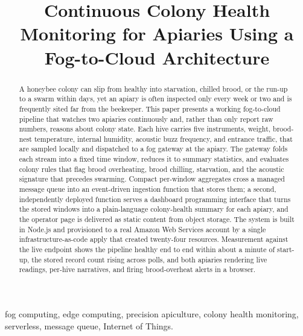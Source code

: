 \documentclass[conference]{IEEEtran}
\begin{document}
\title{Continuous Colony Health Monitoring for Apiaries Using a Fog-to-Cloud Architecture}

\author{
}

\maketitle

\begin{abstract}
A honeybee colony can slip from healthy into starvation, chilled brood, or the run-up to a swarm within days, yet an apiary is often inspected only every week or two and is frequently sited far from the beekeeper. This paper presents a working fog-to-cloud pipeline that watches two apiaries continuously and, rather than only report raw numbers, reasons about colony state. Each hive carries five instruments, weight, brood-nest temperature, internal humidity, acoustic buzz frequency, and entrance traffic, that are sampled locally and dispatched to a fog gateway at the apiary. The gateway folds each stream into a fixed time window, reduces it to summary statistics, and evaluates colony rules that flag brood overheating, brood chilling, starvation, and the acoustic signature that precedes swarming. Compact per-window aggregates cross a managed message queue into an event-driven ingestion function that stores them; a second, independently deployed function serves a dashboard programming interface that turns the stored windows into a plain-language colony-health summary for each apiary, and the operator page is delivered as static content from object storage. The system is built in Node.js and provisioned to a real Amazon Web Services account by a single infrastructure-as-code apply that created twenty-four resources. Measurement against the live endpoint shows the pipeline healthy end to end within about a minute of start-up, the stored record count rising across polls, and both apiaries rendering live readings, per-hive narratives, and firing brood-overheat alerts in a browser.
\end{abstract}

\begin{IEEEkeywords}
fog computing, edge computing, precision apiculture, colony health monitoring, serverless, message queue, Internet of Things.
\end{IEEEkeywords}
\end{document}
